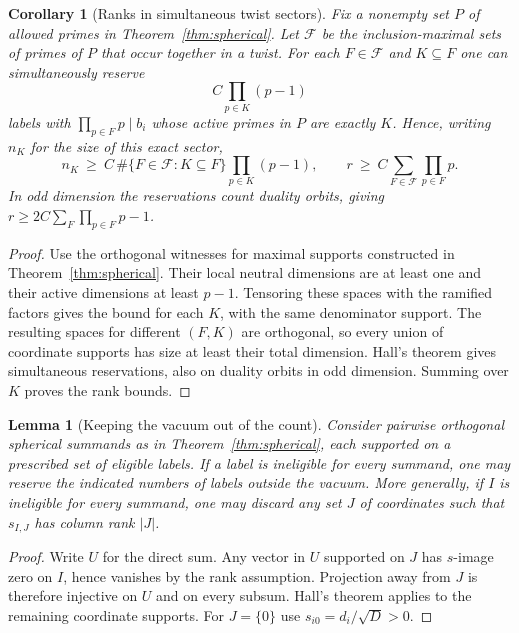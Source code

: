 \documentclass[11pt]{amsart}
\numberwithin{equation}{section}
\newtheorem{lemma}[theorem]{Lemma}
\newtheorem{corollary}[theorem]{Corollary}
\theoremstyle{definition}
\theoremstyle{plain}
\begin{document}
\begin{corollary}[Ranks in simultaneous twist sectors]\label{new:sector-rank}
Fix a nonempty set $P$ of allowed primes in Theorem~\ref{thm:spherical}.
Let $\mathcal F$ be the inclusion-maximal sets of primes of $P$ that
occur together in a twist. For each $F\in\mathcal F$ and $K\subseteq F$
one can simultaneously reserve
\[
             C\prod_{p\in K}(p-1)
\]
labels with $\prod_{p\in F}p\mid b_i$ whose active primes in $P$ are
exactly $K$. Hence, writing $n_K$ for the size of this exact sector,
\[
 n_K\ \ge\ C\,\#\{F\in\mathcal F:K\subseteq F\}
                   \prod_{p\in K}(p-1),
 \qquad
 r\ \ge\ C\sum_{F\in\mathcal F}\prod_{p\in F}p .
\]
In odd dimension the reservations count duality orbits, giving
$r\ge 2C\sum_F\prod_{p\in F}p-1$.
\end{corollary}
\begin{proof}
Use the orthogonal witnesses for maximal supports constructed in
Theorem~\ref{thm:spherical}. Their local neutral dimensions are at
least one and their active dimensions at least $p-1$. Tensoring
these spaces with the ramified factors gives the bound for each
$K$, with the same denominator support. The resulting spaces for
different $(F,K)$ are orthogonal, so every union of coordinate
supports has size at least their total dimension. Hall's theorem
gives simultaneous reservations, also on duality orbits in odd
dimension. Summing over $K$ proves the rank bounds.
\end{proof}


\begin{lemma}[Keeping the vacuum out of the count]\label{lem:vac-reserve}
Consider pairwise orthogonal spherical summands as in
Theorem~\ref{thm:spherical}, each supported on a prescribed set of
eligible labels. If a label is ineligible for every summand, one may
reserve the indicated numbers of labels outside the vacuum.
More generally, if $I$ is ineligible for every summand, one may discard
any set $J$ of coordinates such that $s_{I,J}$ has column rank $|J|$.
\end{lemma}
\begin{proof}
Write $U$ for the direct sum. Any vector in $U$ supported on $J$ has
$s$-image zero on $I$, hence vanishes by the rank assumption. Projection
away from $J$ is therefore injective on $U$ and on every subsum.
Hall's theorem applies to the remaining coordinate supports.
For $J=\{0\}$ use $s_{i0}=d_i/\sqrt D>0$.
\end{proof}
\end{document}
